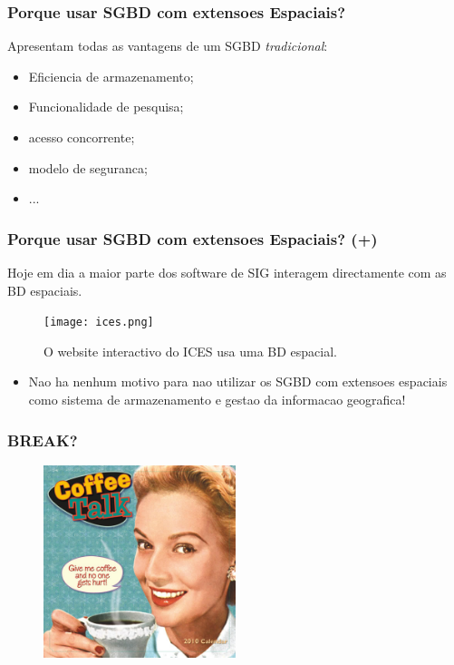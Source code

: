 \documentclass[hyperref={pdfpagelabels=true}]{beamer}
\begin{document}
\begin{frame}
\frametitle{Porque usar SGBD com extensoes Espaciais?}
Apresentam todas as vantagens de um SGBD \textit{tradicional}:\\
    \begin{itemize}
      \item<2-> Eficiencia de armazenamento;
      \item<2-> Funcionalidade de pesquisa;
      \item<2-> acesso concorrente;
      \item<2-> modelo de seguranca;
      \item<2-> ...      
    \end{itemize}
\end{frame}

\begin{frame}
\frametitle{Porque usar SGBD com extensoes Espaciais? (+)}
Hoje em dia a maior parte dos software de SIG interagem directamente com as BD espaciais.\\
  \begin{figure}[!ht]%
    \begin{center}
    \texttt{[image: ices.png]}
      \caption[\tiny{O website interactivo do ICES usa uma BD espacial.}]{\tiny{O website interactivo do ICES usa uma BD espacial.}}
      \label{frame} %
    \end{center}
  \end{figure}    

    \begin{itemize}
      \item<2-> Nao ha nenhum motivo para nao utilizar os SGBD com extensoes espaciais como sistema de armazenamento e gestao da informacao geografica!
    \end{itemize}  
\end{frame}

\begin{frame}
\frametitle{\huge{BREAK?}}
  \begin{figure}
    \begin{center}
	\includegraphics[width=0.5\textwidth ]{coffee_talk.jpg}
    \end{center}
  \end{figure}    
\end{frame}
\end{document}
